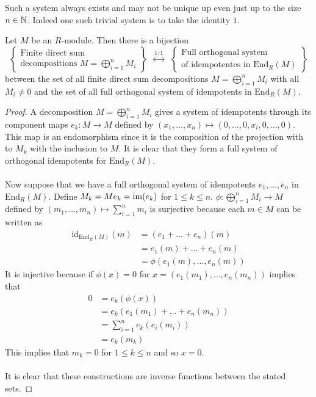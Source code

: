 \documentclass[a4paper]{article}
\begin{document}
Such a system always exists and may not be unique up even just up to the size $n\in\mathbb{N}$. Indeed one such trivial system is to take the identity $1$. 

\begin{prp}{}{} Let $M$ be an $R$-module. Then there is a bijection $$\left\{\substack{\text{Finite direct sum}\\\text{decompositions }M=\bigoplus_{i=1}^n M_i}\right\}\;\;\overset{1:1}{\longleftrightarrow}\;\;\left\{\substack{\text{Full orthogonal system}\\\text{of idempotentes in }\text{End}_R(M)}\right\}$$ between the set of all finite direct sum decompositions $M=\bigoplus_{i=1}^n M_i$ with all $M_i\neq 0$ and the set of all full orthogonal system of idempotents in $\text{End}_R(M)$. \tcbline
\begin{proof}
A decomposition $M=\bigoplus_{i=1}^nM_i$ gives a system of idempotents through its component maps $e_k:M\to M$ defined by $(x_1,\dots,x_n)\mapsto(0,\dots,0,x_i,0,\dots,0)$. This map is an endomorphism since it is the composition of the projection with to $M_k$ with the inclusion to $M$. It is clear that they form a full system of orthogonal idempotents for $\text{End}_R(M)$. \\~\\

Now suppose that we have a full orthogonal system of idempotents $e_1,\dots,e_n$ in $\text{End}_R(M)$. Define $M_k=Me_k=\operatorname{im}(e_k)$ for $1\leq k\leq n$. $\phi:\bigoplus_{i=1}^nM_i\to M$ defined by $(m_1,\dots,m_n)\mapsto\sum_{i=1}^nm_i$ is surjective because each $m\in M$ can be written as 
\begin{align*}
\text{id}_{\text{End}_R(M)}(m)&=(e_1+\dots+e_n)(m)\\
&=e_1(m)+\dots+e_n(m)\\
&=\phi(e_1(m),\dots,e_n(m))
\end{align*}
It is injective because if $\phi(x)=0$ for $x=(e_1(m_1),\dots,e_n(m_n))$ implies that 
\begin{align*}
0&=e_k(\phi(x))\\
&=e_k(e_1(m_1)+\dots+e_n(m_n))\\
&=\sum_{i=1}^ne_k(e_i(m_i))\\
&=e_k(m_k)
\end{align*}
This implies that $m_k=0$ for $1\leq k\leq n$ and so $x=0$. \\~\\

It is clear that these constructions are inverse functions between the stated sets. 
\end{proof}
\end{prp}
\end{document}
